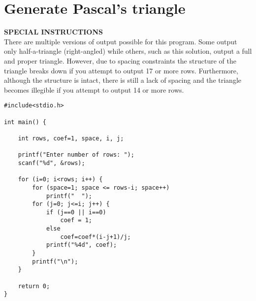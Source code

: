 \documentclass[11pt,oneside]{article}
\newcommand{\info}[1]{\textbf{\scriptsize{\sffamily\addfontfeatures{LetterSpace=7} #1\\[.35em]}}}
\begin{document}
\section{Generate Pascal's triangle}
\begin{infobox}
\info{\MakeUppercase{Special instructions}}
There are multiple versions of output possible for this program. Some output only half-a-triangle (right-angled) while others, such as this solution, output a full and proper triangle. However, due to spacing constraints the structure of the triangle breaks down if you attempt to output 17 or more rows. Furthermore, although the structure is intact, there is still a lack of spacing and the triangle becomes illegible if you attempt to output 14 or more rows.
\end{infobox}
\begin{lstlisting}
#include<stdio.h>

int main() {

    int rows, coef=1, space, i, j;
    
    printf("Enter number of rows: ");
    scanf("%d", &rows);
    
    for (i=0; i<rows; i++) {
        for (space=1; space <= rows-i; space++)
            printf("  ");
        for (j=0; j<=i; j++) {
            if (j==0 || i==0)
                coef = 1;
            else
                coef=coef*(i-j+1)/j;
            printf("%4d", coef);
        }
        printf("\n");
    }
    
    return 0;
}
\end{lstlisting}
\pagebreak
%
%
\end{document}
